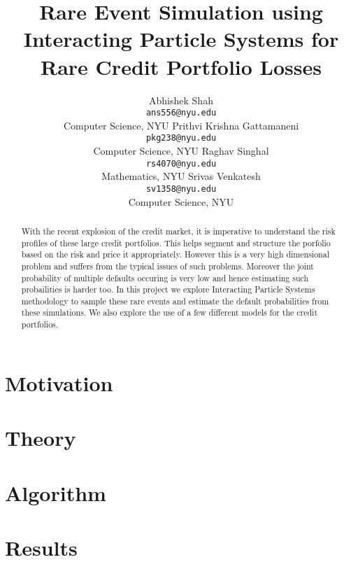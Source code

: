 \documentclass{article}
\title{Rare Event Simulation using Interacting Particle Systems for Rare Credit Portfolio Losses}
\author{
  Abhishek Shah \\
  \texttt{ans556@nyu.edu}\\
  Computer Science,  NYU
  \And
  Prithvi Krishna Gattamaneni\\
  \texttt{pkg238@nyu.edu}\\
  Computer Science,  NYU
  \AND
  Raghav Singhal\\
  \texttt{rs4070@nyu.edu}\\
  Mathematics, NYU
  \And
  Srivas Venkatesh \\
  \texttt{sv1358@nyu.edu} \\
  Computer Science,  NYU
}
\begin{document}
\maketitle

\begin{abstract}
	With the recent explosion of the credit market, it is imperative to understand
	the risk profiles of these large credit portfolios. This helps segment and
	structure the porfolio based on the risk and price it appropriately. However
	this is a very high dimensional problem and suffers from the typical issues
	of such problems. Moreover the joint probability of multiple defaults
	occuring is very low and hence estimating such probailities is harder too.
	In this project we explore Interacting Particle Systems methodology to sample 
	these rare events and estimate the default probabilities from these simulations.
	We also explore the use of a few different models for the credit portfolios.
\end{abstract}
\section{Motivation}

\section{Theory}

\section{Algorithm}

\section{Results}


\clearpage
\nocite{code}

\end{document}
